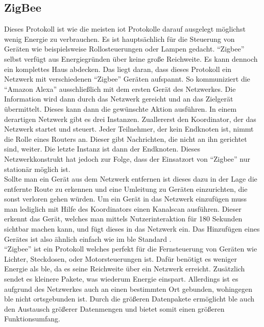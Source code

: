 \subsection{ZigBee}
\label{ss:vergleich:zigbee}

Dieses Protokoll ist wie die meisten \ac{iot} Protokolle darauf ausgelegt möglichst wenig Energie zu verbrauchen. Es ist hauptsächlich für die Steuerung von Geräten wie beispielsweise Rollosteuerungen oder Lampen gedacht. "`Zigbee"' selbst verfügt aus Energiegründen über keine große Reichweite. Es kann dennoch ein komplettes Haus abdecken. Das liegt daran, dass dieses Protokoll ein Netzwerk mit verschiedenen "`Zigbee"' Geräten aufspannt. So kommuniziert die "`Amazon Alexa"' ausschließlich mit dem ersten Gerät des Netzwerkes. Die Information wird dann durch das Netzwerk gereicht und an das Zielgerät übermittelt. Dieses kann dann die gewünschte Aktion ausführen. In einem derartigen Netzwerk gibt es drei Instanzen. Zuallererst den Koordinator, der das Netzwerk startet und steuert. Jeder Teilnehmer, der kein Endknoten ist, nimmt die Rolle eines Routers an. Dieser gibt Nachrichten, die nicht an ihn gerichtet sind, weiter. Die letzte Instanz ist dann der Endknoten. Dieses Netzwerkkonstrukt hat jedoch zur Folge, dass der Einsatzort von "`Zigbee"' nur stationär möglich ist.\\

\noindent Sollte man ein Gerät aus dem Netzwerk entfernen ist dieses dazu in der Lage die entfernte Route zu erkennen und eine Umleitung zu Geräten einzurichten, die sonst verloren gehen würden. Um ein Gerät in das Netzwerk einzufügen muss man lediglich mit Hilfe des Koordinators einen Kanalscan ausführen. Dieser erkennt das Gerät, welches man mittels Nutzerinteraktion für 180 Sekunden sichtbar machen kann, und fügt dieses in das Netzwerk ein. Das Hinzufügen eines Gerätes ist also ähnlich einfach wie im \ac{ble} Standard \cite{ZA:Zig}.\\

\noindent "`Zigbee"' ist ein Protokoll welches perfekt für die Fernsteuerung von Geräten wie Lichter, Steckdosen, oder Motorsteuerungen ist. Dafür benötigt es weniger Energie als \ac{ble}, da es seine Reichweite über ein Netzwerk erreicht. Zusätzlich sendet es kleinere Pakete, was wiederum Energie einspart. Allerdings ist es aufgrund des Netzwerkes auch an einen bestimmten Ort gebunden, wohingegen \ac{ble} nicht ortsgebunden ist. Durch die größeren Datenpakete ermöglicht \ac{ble} auch den Austausch größerer Datenmengen und bietet somit einen größeren Funktionsumfang.\\


